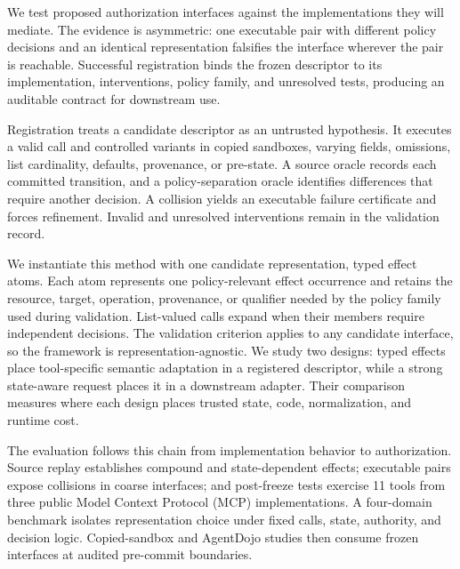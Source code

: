 We test proposed authorization interfaces against the implementations they will
mediate. The evidence is asymmetric: one executable pair with different policy
decisions and an identical representation falsifies the interface wherever the
pair is reachable. Successful registration binds the frozen descriptor to its
implementation, interventions, policy family, and unresolved tests, producing
an auditable contract for downstream use.

Registration treats a candidate descriptor as an untrusted hypothesis. It
executes a valid call and controlled variants in copied sandboxes, varying
fields, omissions, list cardinality, defaults, provenance, or pre-state. A
source oracle records each committed transition, and a policy-separation oracle
identifies differences that require another decision. A collision yields an
executable failure certificate and forces refinement. Invalid and unresolved
interventions remain in the validation record.

We instantiate this method with one candidate representation, typed effect
atoms. Each atom represents one policy-relevant effect occurrence and retains
the resource, target, operation, provenance, or qualifier needed by the policy
family used during validation.
List-valued calls expand when their members require independent decisions. The
validation criterion applies to any candidate interface, so the framework is
representation-agnostic. We study two designs:
typed effects place tool-specific semantic adaptation in a registered
descriptor, while a strong state-aware request places it in a downstream
adapter. Their comparison measures where each design places trusted state,
code, normalization, and runtime cost.

The evaluation follows this chain from implementation behavior to
authorization. Source replay establishes compound and state-dependent effects;
executable pairs expose collisions in coarse interfaces; and post-freeze tests
exercise 11 tools from three public Model Context Protocol (MCP) implementations. A four-domain
benchmark isolates representation choice under fixed calls, state, authority,
and decision logic. Copied-sandbox and AgentDojo studies then consume frozen
interfaces at audited pre-commit boundaries.

